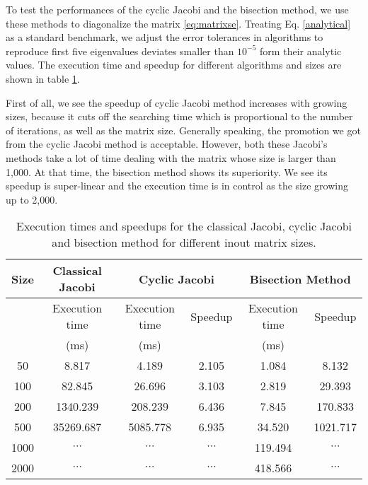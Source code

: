 
To test the performances of the cyclic Jacobi and the bisection method, we use these methods to diagonalize the matrix \ref{eq:matrixse}. 
Treating Eq. \ref{analytical} as a standard benchmark, we adjust the error tolerances in algorithms to reproduce first five eigenvalues deviates smaller than $10^{-5}$ form their analytic values. 
The execution time and speedup for different algorithms and sizes are shown in table \ref{bisectiontab}. 

First of all, we see the speedup of cyclic Jacobi method increases with growing sizes, 
because it cuts off the searching time which is proportional to the number of iterations, as well as the matrix size. 
Generally speaking, the promotion we got from the cyclic Jacobi method is acceptable. 
However, both these Jacobi's methods take a lot of time dealing with the matrix whose size is larger than 1,000.
At that time, the bisection method shows its superiority. 
We see its speedup is super-linear and the execution time is in control as the size growing up to 2,000.
\begin{table}[]
\centering
\caption{Execution times and speedups for the classical Jacobi, cyclic Jacobi and bisection method for different inout matrix sizes.}
\label{bisectiontab}
\begin{tabular}{cccccc}
\hline
\hline
Size & Classical Jacobi & \multicolumn{2}{c}{Cyclic Jacobi} & \multicolumn{2}{c}{Bisection Method} \\
 \hline
     & Execution time   & Execution time       & Speedup     & Execution time    & Speedup  \\
     &(ms)   & (ms)      &     &(ms)   &  \\
 \hline
50   & 8.817            & 4.189               & 2.105       & 1.084            & 8.132      \\
100  & 82.845           & 26.696              & 3.103       & 2.819            & 29.393     \\
200  & 1340.239         & 208.239             & 6.436       & 7.845            & 170.833    \\
500  & 35269.687        & 5085.778            & 6.935       & 34.520           & 1021.717   \\
1000 &$\cdots$                  &$\cdots$                     &$\cdots$             & 119.494          &$\cdots$            \\
2000 &$\cdots$                  &$\cdots$                     &$\cdots$             & 418.566          & $\cdots$           \\
\hline
\hline
\end{tabular}
\end{table}
